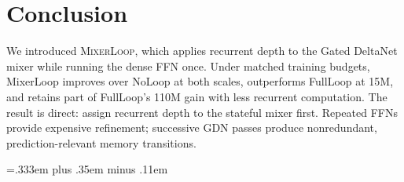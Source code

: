\documentclass[letterpaper]{article} %
\newcommand{\method}{\textsc{MixerLoop}}
\begin{document}
\section{Conclusion}

We introduced \method{}, which applies recurrent depth to the Gated DeltaNet
mixer while running the dense FFN once. Under matched training budgets,
MixerLoop improves over NoLoop at both scales, outperforms FullLoop at 15M, and
retains part of FullLoop's 110M gain with less recurrent computation. The result
is direct: assign recurrent depth to the stateful mixer first. Repeated FFNs
provide expensive refinement; successive GDN passes produce nonredundant,
prediction-relevant memory transitions.


\begingroup
\spaceskip=.333em plus .35em minus .11em\relax

\endgroup

% 
\end{document}
